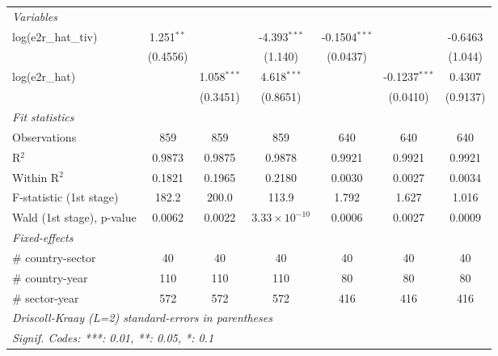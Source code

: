 \documentclass[a4paper]{article}
\begin{document}
\begin{table}[h!]
\begin{tabular}{lcccccc}
      \midrule
       \emph{Variables}\\
     log(e2r\_hat\_tiv)        & 1.251$^{**}$          &                        & -4.393$^{***}$         & -0.1504$^{***}$       &                        & -0.6463\\   
                                & (0.4556)              &                        & (1.140)                & (0.0437)              &                        & (1.044)\\   
      log(e2r\_hat)             &                       & 1.058$^{***}$          & 4.618$^{***}$          &                       & -0.1237$^{***}$        & 0.4307\\   
                                &                       & (0.3451)               & (0.8651)               &                       & (0.0410)               & (0.9137)\\ 
      \emph{Fit statistics}\\
      Observations              & 859                   & 859                    & 859                    & 640                   & 640                    & 640\\  
      R$^2$                     & 0.9873                & 0.9875                 & 0.9878                 & 0.9921                & 0.9921                 & 0.9921\\  
      Within R$^2$              & 0.1821                & 0.1965                 & 0.2180                 & 0.0030                & 0.0027                 & 0.0034\\  
      F-statistic (1st stage)        & 182.2                 & 200.0                  & 113.9                  & 1.792                 & 1.627                  & 1.016\\  
      Wald (1st stage), p-value & 0.0062                & 0.0022                 & $3.33\times 10^{-10}$  & 0.0006                & 0.0027                 & 0.0009\\ 
      \midrule
      \emph{Fixed-effects}\\
      \# country-sector         & 40                   & 40                   & 40                      & 40                   & 40                   & 40
      \\  
      \# country-year           & 110                   & 110                   & 110                      & 80                    & 80                    & 80\\  
      \# sector-year            & 572                   & 572                   & 572                      & 416                   & 416                   & 416\\  
      \midrule \midrule
      \multicolumn{7}{l}{\emph{Driscoll-Kraay (L=2) standard-errors in parentheses}}\\
      \multicolumn{7}{l}{\emph{Signif. Codes: ***: 0.01, **: 0.05, *: 0.1}}\\
   \end{tabular}
\end{table}
\end{document}
